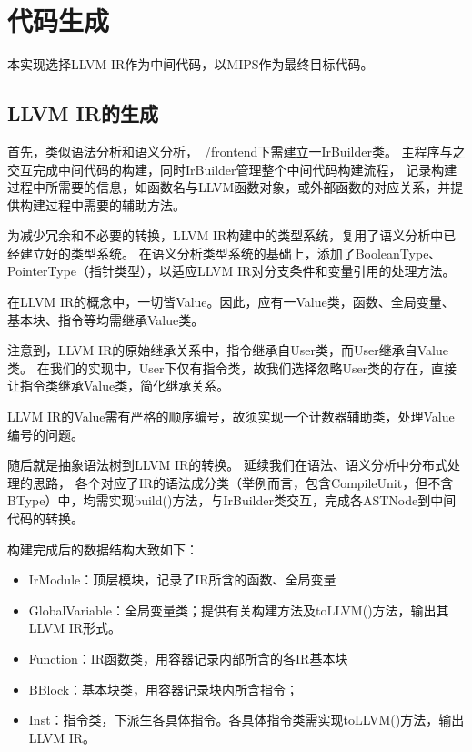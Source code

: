 

\section{代码生成}

本实现选择LLVM IR作为中间代码，以MIPS作为最终目标代码。

\subsection{LLVM IR的生成}

首先，类似语法分析和语义分析，~/frontend下需建立一IrBuilder类。
主程序与之交互完成中间代码的构建，同时IrBuilder管理整个中间代码构建流程，
记录构建过程中所需要的信息，如函数名与LLVM函数对象，或外部函数的对应关系，并提供构建过程中需要的辅助方法。

为减少冗余和不必要的转换，LLVM IR构建中的类型系统，复用了语义分析中已经建立好的类型系统。
在语义分析类型系统的基础上，添加了BooleanType、PointerType（指针类型），以适应LLVM IR对分支条件和变量引用的处理方法。

在LLVM IR的概念中，一切皆Value。因此，应有一Value类，函数、全局变量、基本块、指令等均需继承Value类。

注意到，LLVM IR的原始继承关系中，指令继承自User类，而User继承自Value类。
在我们的实现中，User下仅有指令类，故我们选择忽略User类的存在，直接让指令类继承Value类，简化继承关系。

LLVM IR的Value需有严格的顺序编号，故须实现一个计数器辅助类，处理Value编号的问题。

随后就是抽象语法树到LLVM IR的转换。
延续我们在语法、语义分析中分布式处理的思路，
各个对应了IR的语法成分类（举例而言，包含CompileUnit，但不含BType）中，均需实现build()方法，与IrBuilder类交互，完成各ASTNode到中间代码的转换。

构建完成后的数据结构大致如下：
\begin{itemize}
    \item IrModule：顶层模块，记录了IR所含的函数、全局变量
    \item GlobalVariable：全局变量类；提供有关构建方法及toLLVM()方法，输出其LLVM IR形式。
    \item Function：IR函数类，用容器记录内部所含的各IR基本块
    \item BBlock：基本块类，用容器记录块内所含指令；
    \item Inst：指令类，下派生各具体指令。各具体指令类需实现toLLVM()方法，输出LLVM IR。
\end{itemize}

